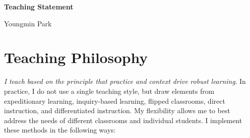 \documentclass[a4paper,11pt]{article}
\begin{document}
\begin{center}
\Large \textbf{Teaching Statement}

\Large Youngmin Park
\end{center}



\section{Teaching Philosophy}

\textit{I teach based on the principle that practice and context drive robust learning}. In practice, I do not use a single teaching style, but draw elements from expeditionary learning, inquiry-based learning, flipped classrooms, direct instruction, and differentiated instruction. My flexibility allows me to best address the needs of different classrooms and individual students. I implement these methods in the following ways:
\end{document}

